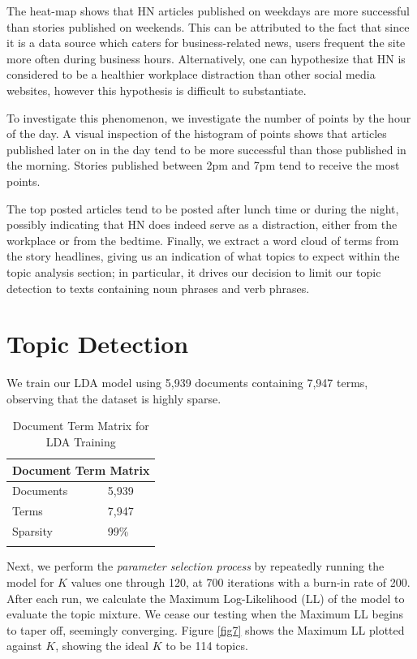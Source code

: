 \documentclass[11pt,journal,final,a4paper]{IEEEtran}
\begin{document}
The heat-map shows that HN articles published on weekdays are more successful than stories published on weekends. This can be attributed to the fact that since it is a data source which caters for business-related news, users frequent the site more often during business hours. Alternatively, one can hypothesize that HN is considered to be a healthier workplace distraction than other social media websites, however this hypothesis is difficult to substantiate.

To investigate this phenomenon, we investigate the number of points by the hour of the day. A visual inspection of the histogram of points shows that articles published later on in the day tend to be more successful than those published in the morning. Stories published between 2pm and 7pm tend to receive the most points.

The top posted articles tend to be posted after lunch time or during the night, possibly indicating that HN does indeed serve as a distraction, either from the workplace or from the bedtime. Finally, we extract a word cloud of terms from the story headlines, giving us an indication of what topics to expect within the topic analysis section; in particular, it drives our decision to limit our topic detection to texts containing noun phrases and verb phrases.

\section{Topic Detection}
We train our LDA model using 5,939 documents containing 7,947 terms, observing that the dataset is highly sparse.  

\begin{table}[!ht]
\centering
\begin{tabular}{ll}
\hline
\multicolumn{2}{l}{Document Term Matrix} \\ \hline
Documents             & 5,939            \\ \hline
Terms                 & 7,947            \\ \hline
Sparsity              & 99\%             \\ \hline
\\
\end{tabular}
\caption{Document Term Matrix for LDA Training}
\label{tab:dtmatrix}
\end{table}

Next, we perform the \textit{parameter selection process} by repeatedly running the model for $K$ values one through 120, at 700 iterations with a burn-in rate of 200. After each run, we calculate the Maximum Log-Likelihood (LL) of the model to evaluate the topic mixture. We cease our testing when the Maximum LL begins to taper off, seemingly converging. Figure \ref{fig7} shows the Maximum LL plotted against $K$, showing the ideal $K$ to be 114 topics.
\end{document}
